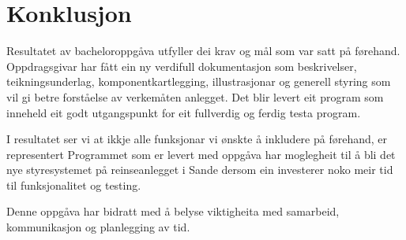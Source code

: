 \chapter{Konklusjon}
\thispagestyle{fancy}

Resultatet av bacheloroppgåva utfyller dei krav og mål som var satt på førehand.
Oppdragsgivar har fått ein ny verdifull dokumentasjon som beskrivelser, teikningsunderlag, komponentkartlegging,
illustrasjonar og generell styring som vil gi betre forståelse av verkemåten anlegget.
Det blir levert eit program som inneheld eit godt utgangspunkt for eit fullverdig og ferdig testa program.

I resultatet ser vi at ikkje alle funksjonar vi ønskte å inkludere på førehand, er representert
Programmet som er levert med oppgåva har moglegheit til å bli det nye styresystemet på reinseanlegget i Sande
dersom ein investerer noko meir tid til funksjonalitet og testing.

Denne oppgåva har bidratt med å belyse viktigheita med samarbeid, kommunikasjon og planlegging av tid.



